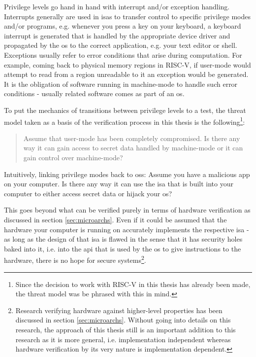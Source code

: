 Privilege levels go hand in hand with interrupt and/or exception handling.
Interrupts generally are used in \glspl{isa} to transfer control to specific privilege modes and/or programs, e.g. whenever you press a key on your keyboard, a keyboard interrupt is generated that is handled by the appropriate device driver and propagated by the \gls{os} to the correct application, e.g. your text editor or shell.
Exceptions usually refer to error conditions that arise during computation.
For example, coming back to physical memory regions in RISC-V, if user-mode would attempt to read from a region unreadable to it an exception would be generated.
It is the obligation of software running in machine-mode to handle such error conditions - usually related software comes as part of an \gls{os}.

To put the mechanics of transitions between privilege levels to a test, the threat model taken as a basis of the verification process in this thesis is the following\footnote{%
    Since the decision to work with RISC-V in this thesis has already been made, the threat model was be phrased with this in mind.
}:
\begin{quote}
    Assume that user-mode has been completely compromised.
    Is there any way it can gain access to secret data handled by machine-mode or it can gain control over machine-mode?
\end{quote}

Intuitively, linking privilege modes back to \glspl{os}: Assume you have a malicious app on your computer.
Is there any way it can use the \gls{isa} that is built into your computer to either access secret data or hijack your \gls{os}?

This goes beyond what can be verified purely in terms of hardware verification as discussed in section \ref{sec:microarchs}.
Even if it could be assumed that the hardware your computer is running on accurately implements the respective \gls{isa} - as long as the design of that \gls{isa} is flawed in the sense that it has security holes baked into it, i.e. into the \gls{api} that is used by the \gls{os} to give instructions to the hardware, there is no hope for secure systems\footnote{%
    Research verifying hardware against higher-level properties has been discussed in section \ref{sec:microarchs}.
    Without going into details on this research, the approach of this thesis still is an important addition to this research as it is more general, i.e. implementation independent whereas hardware verification by its very nature is implementation dependent.
}.

